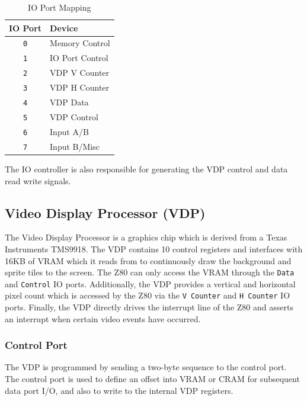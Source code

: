 \documentclass{article}
\begin{document}
\begin{table}[H]
    \centering
    \begin{tabular}{cl}
        \toprule
        \textbf{IO Port} & \textbf{Device} \\
        \midrule
        \texttt{0} & Memory Control \\
        \texttt{1} & IO Port Control\\
        \texttt{2} & VDP V Counter \\
        \texttt{3} & VDP H Counter \\
        \texttt{4} & VDP Data \\
        \texttt{5} & VDP Control \\
        \texttt{6} & Input A/B \\
        \texttt{7} & Input B/Misc \\
        \bottomrule
    \end{tabular}
    \caption{IO Port Mapping}
\end{table}

The IO controller is also responsible for generating the VDP control and
data read write signals.

\subsection{Video Display Processor (VDP)}

The Video Display Processor is a graphics chip which is derived from a Texas
Instruments TMS9918. The VDP contains 10 control registers and interfaces with
16KB of VRAM which it reads from to continuously draw the background and sprite
tiles to the screen. The Z80 can only access the VRAM through the \texttt{Data}
and \texttt{Control} IO ports. Additionally, the VDP provides a vertical and
horizontal pixel count which is accessed by the Z80 via the \texttt{V Counter}
and \texttt{H Counter} IO ports.  Finally, the VDP directly drives the
interrupt line of the Z80 and asserts an interrupt when certain video events
have occurred.

\subsubsection{Control Port}

The VDP is programmed by sending a two-byte sequence to the control port. The
control port is used to define an offset into VRAM or CRAM for subsequent data
port I/O, and also to write to the internal VDP registers.
\end{document}
